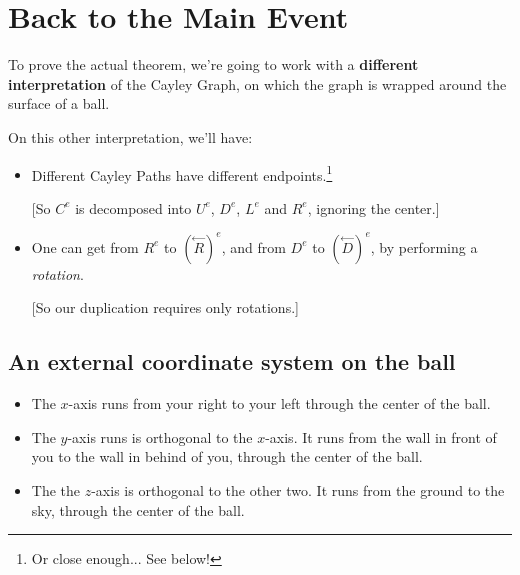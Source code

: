 \documentclass[12pt]{extarticle}
\begin{document}
\section{Back to the Main Event}
To prove the actual theorem, we're going to work with a \textbf{different interpretation} of the Cayley Graph, on which the graph is wrapped around the surface of a ball. 

\vspace{4mm}
\noindent
On this other interpretation, we'll have:
\begin{itemize}


\item  Different Cayley Paths have different endpoints.\footnote{Or close enough... See below!}

[So \(C^e\) is decomposed into \(U^e\), \(D^e\), \(L^e\) and \(R^e\), ignoring the center.]

\item One can get from \(R^e\) to \(\left(\stackrel{\leftarrow}{R}\right)^e\), and from \(D^e\) to \(\left(\stackrel{\leftarrow}{D}\right)^e\), by performing a \emph{rotation}. 

[So our duplication requires only rotations.]

\end{itemize}







\subsection{An external coordinate system on the ball}


\begin{itemize}

\item The \(x\)-axis runs from your right to your left through the center of the ball. 

\item The \(y\)-axis runs is orthogonal to the \(x\)-axis. It runs from the wall in front of you to the wall in behind of you, through the center of the ball.

\item The the \(z\)-axis is orthogonal to the other two. It runs from the ground to the sky, through the center of the ball. 

\end{itemize}
\end{document}
